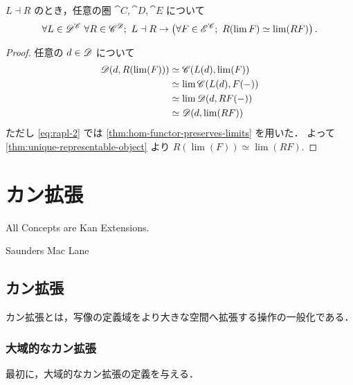 \documentclass[titlepage]{ltjsreport}
\begin{document}
{
  \def\C{\cat{C}}%
  \def\D{\cat{D}}%
  \def\E{\cat{E}}%
  \def\L{L}%
  \def\R{R}%
  \def\F{F}%
  \def\d{d}%
  \begin{theorem}[右随伴は極限を保存する]
    $\L\dashv\R$ のとき，任意の圏 $\C,\D,\E$ について
    \begin{equation}
      \forall\L\in\objs{\Fun{\C}{\D}}\ \forall\R\in\objs{\Fun{\D}{\C}};
      \ \L\dashv\R\rightarrow\left(
      \forall\F\in\objs{\Fun{\C}{\E}};\ \R(\lim{\F})\simeq\lim(\R\F)
      \right).
    \end{equation}
  \end{theorem}
  \begin{proof}
    任意の $\d\in\objs{\D}$ について
    \begin{align}
      \mrps{\D}{\d}{\R(\lim(F))}
       & \simeq\mrps{\C}{\L(\d)}{\lim(F)}                   \\
       & \simeq\lim\mrps{\C}{\L(\d)}{F(-)}\label{eq:rapl-2} \\
       & \simeq\lim\mrps{\D}{\d}{RF(-)}                     \\
       & \simeq\mrps{\D}{\d}{\lim(RF)}
    \end{align}
    ただし \cref{eq:rapl-2} では \cref{thm:hom-functor-preserves-limits}
    を用いた．
    よって \cref{thm:unique-representable-object} より $\R(\lim(F))\simeq\lim(RF)$.
  \end{proof}
}

\chapter{カン拡張}

\epigraph{All Concepts are Kan Extensions.}{Saunders Mac Lane}

\section{カン拡張}

カン拡張とは，写像の定義域をより大きな空間へ拡張する操作の一般化である．

\subsection{大域的なカン拡張}

最初に，大域的なカン拡張の定義を与える．
\end{document}

